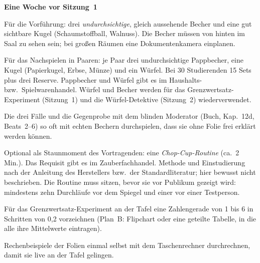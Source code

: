 \begin{vorbereitung}
\textbf{Eine Woche vor Sitzung~1}
\begin{checkliste}
  \item Für die Vorführung: drei \emph{undurchsichtige}, gleich aussehende
    Becher und eine gut sichtbare Kugel (Schaumstoffball, Walnuss). Die
    Becher müssen von hinten im Saal zu sehen sein; bei großen Räumen eine
    Dokumentenkamera einplanen.
  \item Für das Nachspielen in Paaren: je Paar drei undurchsichtige
    Pappbecher, eine Kugel (Papierkugel, Erbse, Münze) und ein Würfel.
    Bei 30 Studierenden 15 Sets plus drei Reserve. Pappbecher und Würfel
    gibt es im Haushalts- bzw.\ Spielwarenhandel. Würfel und Becher werden
    für das Grenzwertsatz-Experiment (Sitzung~1) und die Würfel-Detektive
    (Sitzung~2) wiederverwendet.
  \item Die drei Fälle und die Gegenprobe mit dem blinden Moderator
    (Buch, Kap.~12d, Beats~2--6) so oft mit echten Bechern durchspielen,
    dass sie ohne Folie frei erklärt werden können.
  \item Optional als Staunmoment des Vortragenden: eine
    \emph{Chop-Cup-Routine} (ca.\ 2 Min.). Das Requisit gibt es im
    Zauberfachhandel. Methode und Einstudierung nach der Anleitung des
    Herstellers bzw.\ der Standardliteratur; hier bewusst nicht
    beschrieben. Die Routine muss sitzen, bevor sie vor Publikum gezeigt
    wird: mindestens zehn Durchläufe vor dem Spiegel und einer vor
    einer Testperson.
  \item Für das Grenzwertsatz-Experiment an der Tafel eine Zahlengerade von
    1 bis 6 in Schritten von 0,2 vorzeichnen (Plan~B: Flipchart oder
    eine geteilte Tabelle, in die alle ihre Mittelwerte eintragen).
  \item Rechenbeispiele der Folien einmal selbst mit dem Taschenrechner
    durchrechnen, damit sie live an der Tafel gelingen.
\end{checkliste}


\end{vorbereitung}
